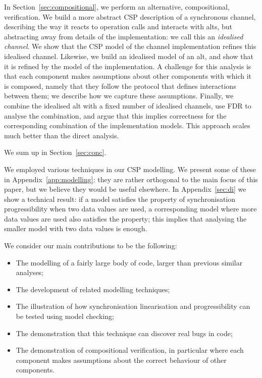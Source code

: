 In Section~\ref{sec:compositional}, we perform an alternative, compositional,
verification.  We build a more abstract CSP description of a synchronous
channel, describing the way it reacts to operation calls and interacts with
alts, but abstracting away from details of the implementation: we call this an
\emph{idealised channel}.  We show that the CSP model of the channel
implementation refines this idealised channel.  Likewise, we build an
idealised model of an alt, and show that it is refined by the model of the
implementation.  A challenge for this analysis is that each component makes
assumptions about other components with which it is composed, namely that they
follow the protocol that defines interactions between them; we describe how we
capture these assumptions.  Finally, we combine the idealised alt with a fixed
number of idealised channels, use FDR to analyse the combination, and argue
that this implies correctness for the corresponding combination of the
implementation models.  This approach scales much better than the direct
analysis.

We sum up in Section~\ref{sec:conc}.

We employed various techniques in our CSP modelling.  We present some of these
in Appendix~\ref{app:modelling}: they are rather orthogonal to the main focus
of this paper, but we believe they would be useful elsewhere.  In
Appendix~\ref{sec:di} we show a technical result: if a model satisfies the
property of synchronisation progressibility when two data values are used, a
corresponding model where more data values are used also satisfies the
property; this implies that analysing the smaller model with two data values
is enough. 

We consider our main contributions to be the following:
%
\begin{itemize}
\item The modelling of a fairly large body of code, larger than previous
  similar analyses;

\item The development of related modelling techniques;

\item The illustration of how synchronisation linearisation and
  progressibility can be tested using model checking;

\item The demonstration that this technique can discover real bugs in code;

\item The demonstration of compositional verification, in particular where
  each component makes assumptions about the correct behaviour of other
  components. 
\end{itemize}


